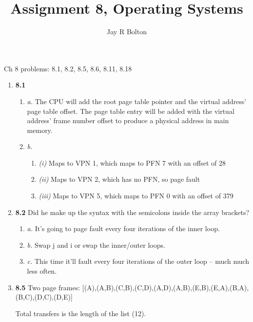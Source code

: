 \documentclass{article}
\title{Assignment 8, Operating Systems}
\author{Jay R Bolton}
\begin{document}
\maketitle

Ch 8 problems: 8.1, 8.2, 8.5, 8.6, 8.11, 8.18

\begin{enumerate}

\item{\textbf{8.1}}
\begin{enumerate}
\item{\emph{a.}} The CPU will add the root page table pointer and the virtual
address' page table offset. The page table entry will be added with the virtual
address' frame number offset to produce a physical address in main memory.

\item{\emph{b.}}

\begin{enumerate}
  \item{\emph{(i)}} Maps to VPN 1, which maps to PFN 7 with an offset of 28 
  \item{\emph{(ii)}} Maps to VPN 2, which has no PFN, so page fault
  \item{\emph{(iii)}} Maps to VPN 5, which maps to PFN 0 with an offset of 379
\end{enumerate}

\end{enumerate}

\item{\textbf{8.2}}
Did he make up the syntax with the semicolons inside the array brackets?

\begin{enumerate}
\item{\emph{a.}} 
It's going to page fault every four iterations of the inner loop.

\item{\emph{b.}} 
Swap j and i or swap the inner/outer loops.

\item{\emph{c.}}
This time it'll fault every four iterations of the outer loop -- much much less
often.

\end{enumerate}

\item{\textbf{8.5}}
Two page frames:
[(A),(A,B),(C,B),(C,D),(A,D),(A,B),(E,B),(E,A),(B,A),(B,C),(D,C),(D,E)]

Total transfers is the length of the list (12).


\end{enumerate}
\end{document}
